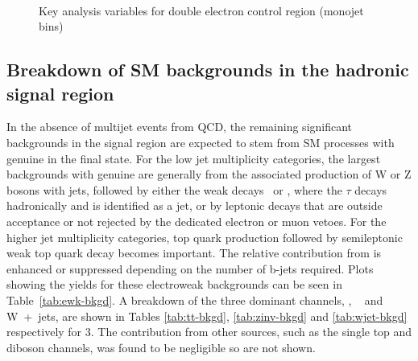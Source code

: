 \begin{figure}
\begin{center}
         \\
        \caption{Key analysis variables for double electron control region (monojet bins)}
        \label{fig:distribution_doubleele_mono}
    \end{center}
\end{figure}

\subsection{Breakdown of SM backgrounds in the hadronic signal
  region\label{sec:bkgd-comp}}

In the absence of multijet events from QCD, the remaining significant
backgrounds in the signal region are expected to stem from SM
processes with genuine \met in the final state. For the low jet
multiplicity categories, the largest backgrounds with genuine \met are
generally from the associated production of W or Z bosons with jets,
followed by either the weak decays \znunu\ or \wtaunu, where the
$\tau$ decays hadronically and is identified as a jet, or by leptonic
decays that are outside acceptance or not rejected by the dedicated
electron or muon vetoes. For the higher jet multiplicity categories,
top quark production followed by semileptonic weak top quark decay
becomes important. The relative contribution from \ttbar is enhanced
or suppressed depending on the number of b-jets required. 
Plots showing the yields for these electroweak backgrounds can be seen in Table~\ref{tab:ewk-bkgd}.
A breakdown of the three
dominant channels, \ttbar, \zInv~ and W~+~jets, are shown in Tables \ref{tab:tt-bkgd}, 
\ref{tab:zinv-bkgd} and \ref{tab:wjet-bkgd} respectively for 3\ifb. The contribution from
other sources, such as the single top and diboson channels, was found to be
negligible so are not shown.

